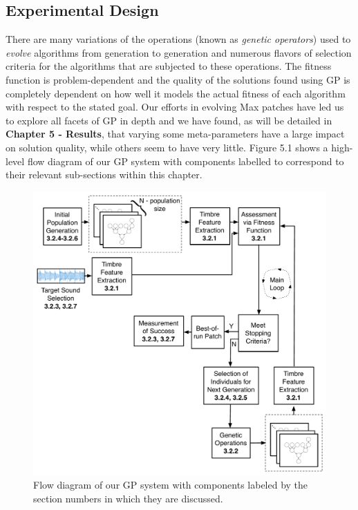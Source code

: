 \documentclass[a4paper,12pt]{report} 	%
\numberwithin{figure}{chapter}
\numberwithin{table}{chapter}
\numberwithin{equation}{chapter}
\begin{document}
\begin{flushleft}
\chapter{Experimental Design} %
There are many variations of the operations (known as \emph{genetic operators}) used to \emph{evolve} algorithms from generation to generation and numerous flavors of selection criteria for the algorithms that are subjected to these operations. The fitness function is problem-dependent and the quality of the solutions found using GP is completely dependent on how well it models the actual fitness of each algorithm with respect to the stated goal. Our efforts in evolving Max patches have led us to explore all facets of GP in depth and we have found, as will be detailed in \textbf{Chapter 5 - Results}, that varying some meta-parameters have a large impact on solution quality, while others seem to have very little. Figure 5.1 shows a high-level flow diagram of our GP system with components labelled to correspond to their relevant sub-sections within this chapter.
\begin{figure}[h!]
\begin{center}
\includegraphics[scale=0.5]{OverallGPSystem}
\caption[Flow Diagram of Overall GP System]{Flow diagram of our GP system with components labeled by the section numbers in which they are discussed.}
\end{center}

\end{figure}
\end{flushleft}
\end{document}
